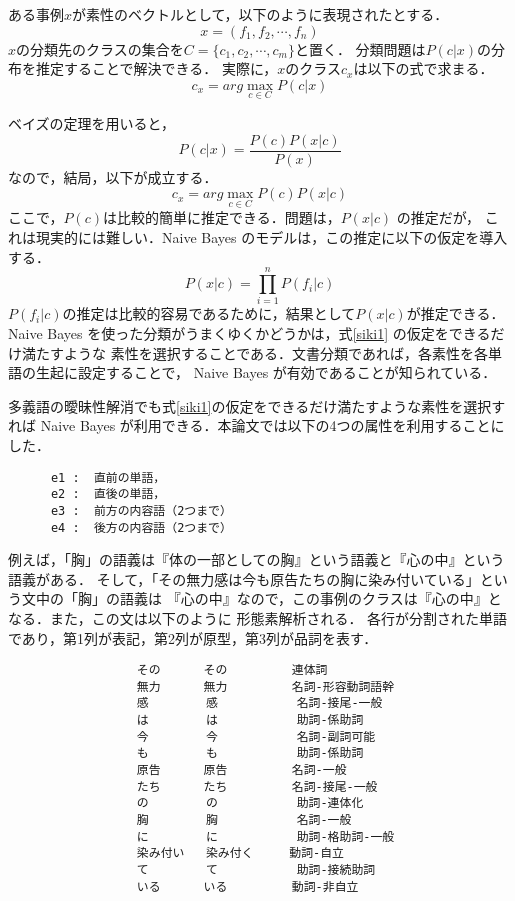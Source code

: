 ある事例\( x \)が素性のベクトルとして，以下のように表現されたとする．
\[
x = (f_1,f_2,\cdots,f_n )
\]
\( x \)の分類先のクラスの集合を\( C = \{ c_1,c_2, \cdots, c_m \} \)と置く．
分類問題は\( P(c|x) \)の分布を推定することで解決できる．
実際に，\( x \)のクラス\( c_x \)は以下の式で求まる．
\[
c_x = arg \max_{c \in C} P(c|x)
\]

ベイズの定理を用いると，
\[
P(c|x) = \frac{P(c)P(x|c)}{P(x)}
\]
\noindent
なので，結局，以下が成立する．
\[
c_x = arg \max_{c \in C} P(c)P(x|c)
\]
ここで，\( P(c) \)は比較的簡単に推定できる．問題は，\( P(x|c) \) の推定だが，
これは現実的には難しい．Naive Bayes のモデルは，この推定に以下の仮定を導入する．
\begin{equation}
  \label{siki1}
P(x|c) = \prod_{i = 1}^{n} P(f_i|c)  
\end{equation}
\( P(f_i|c) \)の推定は比較的容易であるために，結果として\( P(x|c) \)が推定できる\cite{ml-text}．
Naive Bayes を使った分類がうまくゆくかどうかは，\mbox{式\ref{siki1}} の仮定をできるだけ満たすような
素性を選択することである．文書分類であれば，各素性を各単語の生起に設定することで，
Naive Bayes が有効であることが知られている．

多義語の曖昧性解消でも\mbox{式\ref{siki1}}の仮定をできるだけ満たすような素性を選択すれば
Naive Bayes が利用できる．本論文では以下の4つの属性を利用することにした．

\bigskip
\begin{verbatim}
      e1 :  直前の単語，
      e2 :  直後の単語，
      e3 :  前方の内容語（2つまで）
      e4 :  後方の内容語（2つまで）
\end{verbatim}
\bigskip

例えば，「胸」の語義は『体の一部としての胸』という語義と『心の中』という語義がある．
そして，「その無力感は今も原告たちの胸に染み付いている」という文中の「胸」の語義は
『心の中』なので，この事例のクラスは『心の中』となる．また，この文は以下のように
形態素解析される．
各行が分割された単語であり，第1列が表記，第2列が原型，第3列が品詞を表す．

\bigskip
\begin{verbatim}
                  その      その         連体詞           
                  無力      無力         名詞-形容動詞語幹                
                  感        感           名詞-接尾-一般           
                  は        は           助詞-係助詞              
                  今        今           名詞-副詞可能            
                  も        も           助詞-係助詞              
                  原告      原告         名詞-一般                
                  たち      たち         名詞-接尾-一般           
                  の        の           助詞-連体化              
                  胸        胸           名詞-一般                
                  に        に           助詞-格助詞-一般         
                  染み付い   染み付く     動詞-自立
                  て        て           助詞-接続助詞            
                  いる      いる         動詞-非自立
\end{verbatim}
\bigskip


